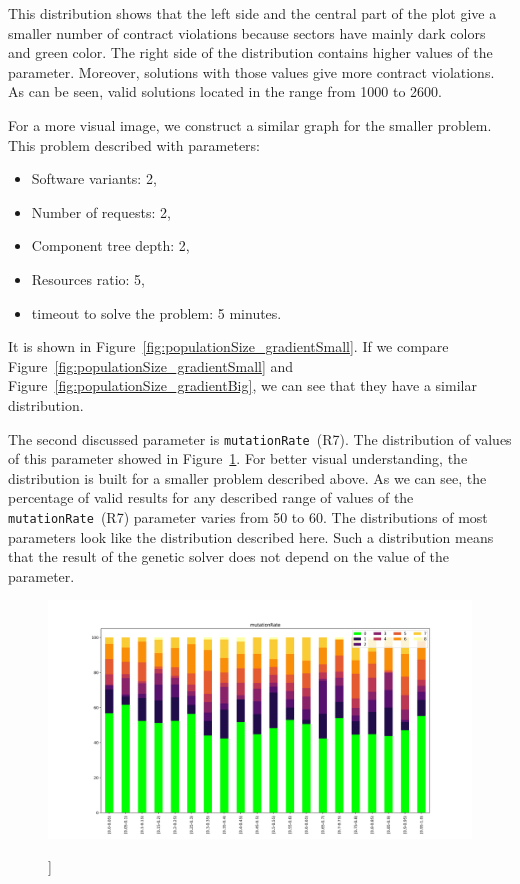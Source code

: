 This distribution shows that the left side and the central part of the plot give a smaller number of contract violations because sectors have mainly dark colors and green color. The right side of the distribution contains higher values of the parameter. Moreover, solutions with those values give more contract violations. As can be seen, valid solutions located in the range from 1000 to 2600.

For a more visual image, we construct a similar graph for the smaller problem. This problem described with parameters:
\begin{itemize}
	\item Software variants: 2,
	\item Number of requests: 2,
	\item Component tree depth: 2,
	\item Resources ratio: 5,
	\item timeout to solve the problem: 5 minutes.
\end{itemize}

It is shown in Figure~\ref{fig:populationSize_gradientSmall}. If we compare Figure~\ref{fig:populationSize_gradientSmall} and Figure~\ref{fig:populationSize_gradientBig}, we can see that they have a similar distribution.

The second  discussed parameter is \texttt{mutationRate}~(R7). The distribution of values of this parameter showed in Figure~\ref{fig:mutationRate_gradient}. For better visual understanding, the distribution is built for a smaller problem described above. 
As we can see, the percentage of valid results for any described range of values of the \texttt{mutationRate}~(R7) parameter varies from 50 to 60. The distributions of most parameters look like the distribution described here. Such a distribution means that the result of the genetic solver does not depend on the value of the parameter. 

\begin{figure}
	\centering
	\includegraphics[width=\textwidth]{images/mutationRate_gradient_500dpi.png}
	\caption[]]{}
	\label{fig:mutationRate_gradient}
\end{figure}

